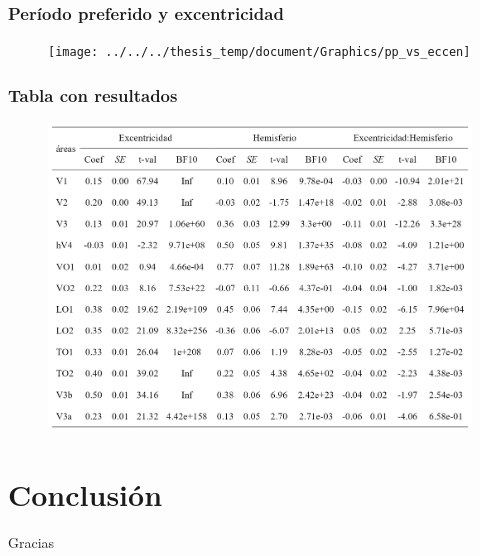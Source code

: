 \documentclass[
11pt, %
%
aspectratio=169, %
]{beamer}
\begin{document}
	\begin{frame}
		\frametitle{Per\'iodo preferido y excentricidad}
		
		\begin{figure}[h!]
			\centering
			\texttt{[image: ../../../thesis\_temp/document/Graphics/pp\_vs\_eccen]}
		\end{figure}
		
		
		
	\end{frame}
	
	\begin{frame}
		\frametitle{Tabla con resultados}
		\begin{figure}
			\centering
			\includegraphics[scale=0.45]{Graphics/table_pp}
		\end{figure}
		
	\end{frame}
	

	
	

	\section{Conclusión}
	
	
	\begin{frame}
		
        \centering		
		\LARGE Gracias
		
		
		
		
	\end{frame}
	

	
\end{document}
